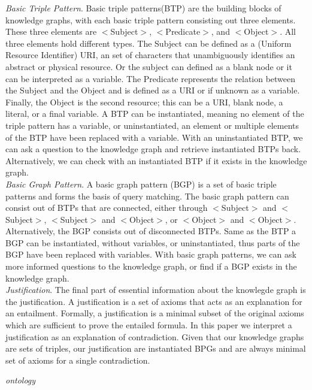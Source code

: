 \documentclass{article}
\begin{document}
\textit{Basic Triple Pattern}. Basic triple patterns(BTP) are the building blocks of knowledge graphs, with each basic triple pattern consisting out three elements.
These three elements are $<$Subject$>$, $<$Predicate$>$, and $<$Object$>$. All three elements hold different types. The Subject can be defined as a (Uniform Resource Identifier) URI, an set of characters that unambiguously identifies an abstract or physical resource. Or the subject can defined as a blank node or it can be interpreted as a variable. The Predicate represents the relation between the Subject and the Object and is defined as a URI or if unknown as a variable. Finally, the Object is the second resource; this can be a URI, blank node, a literal, or a final variable. A BTP can be instantiated, meaning no element of the triple pattern has a variable, or uninstantiated, an element or multiple elements of the BTP have been replaced with a variable. With an uninstantiated BTP, we can ask a question to the knowledge graph and retrieve instantiated BTPs back. Alternatively, we can check with an instantiated BTP if it exists in the knowledge graph.\\

\textit{Basic Graph Pattern}. A basic graph pattern (BGP) is a set of basic triple patterns and forms the basis of query matching. The basic graph pattern
can consist out of BTPs that are connected, either through $<$Subject$>$ and $<$Subject$>$, $<$Subject$>$ and $<$Object$>$, or $<$Object$>$ and $<$Object$>$.
Alternatively, the BGP consists out of disconnected BTPs. Same as the BTP a BGP can be instantiated, without variables, or uninstantiated, thus parts of the BGP have been replaced with variables. With basic graph patterns, we can ask more informed questions to the knowledge graph, or find if a BGP exists in the knowledge graph.\\

\textit{Justification}. The final part of essential information about the knowlegde graph is the justification\cite{Horridge:2009}. A justification is a set of axioms that acts as an explanation for an entailment.
Formally, a justification is a minimal subset of the original axioms which are sufficient to prove the entailed formula. In this paper we interpret a justification as an explanation of contradiction. Given that our knowledge graphs are sets of triples, our justification are instantiated BPGs and are always minimal set of axioms for a single contradiction. 

\textit{ontology}
\end{document}
